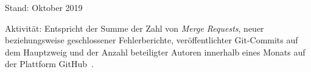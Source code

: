 \begin{table}[tb]
{    \vspace{\baselineskip}
    Stand: Oktober 2019
    \begin{justify}
      Aktivität: Entspricht der Summe der Zahl von \emph{Merge Requests}, neuer beziehungsweise geschlossener Fehlerberichte, veröffentlichter Git-Commits auf dem Hauptzweig und der Anzahl beteiligter Autoren innerhalb eines Monats auf der Plattform GitHub~\autocite{GITHUB}.
    \end{justify}
  }
  \label{tab:transpilers}
\end{table}
\endgroup
